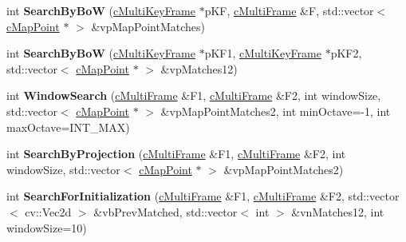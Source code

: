 \begin{DoxyCompactItemize}
\item 
int {\bfseries Search\+By\+BoW} (\hyperlink{classMultiColSLAM_1_1cMultiKeyFrame}{c\+Multi\+Key\+Frame} $\ast$p\+KF, \hyperlink{classMultiColSLAM_1_1cMultiFrame}{c\+Multi\+Frame} \&F, std\+::vector$<$ \hyperlink{classMultiColSLAM_1_1cMapPoint}{c\+Map\+Point} $\ast$ $>$ \&vp\+Map\+Point\+Matches)\hypertarget{classMultiColSLAM_1_1cORBmatcher_ae06c9402eb6badda92ddd6ff73a8bf52}{}\label{classMultiColSLAM_1_1cORBmatcher_ae06c9402eb6badda92ddd6ff73a8bf52}

\item 
int {\bfseries Search\+By\+BoW} (\hyperlink{classMultiColSLAM_1_1cMultiKeyFrame}{c\+Multi\+Key\+Frame} $\ast$p\+K\+F1, \hyperlink{classMultiColSLAM_1_1cMultiKeyFrame}{c\+Multi\+Key\+Frame} $\ast$p\+K\+F2, std\+::vector$<$ \hyperlink{classMultiColSLAM_1_1cMapPoint}{c\+Map\+Point} $\ast$ $>$ \&vp\+Matches12)\hypertarget{classMultiColSLAM_1_1cORBmatcher_aefe9ccdcfd922cf4513e622fa43ee8f8}{}\label{classMultiColSLAM_1_1cORBmatcher_aefe9ccdcfd922cf4513e622fa43ee8f8}

\item 
int {\bfseries Window\+Search} (\hyperlink{classMultiColSLAM_1_1cMultiFrame}{c\+Multi\+Frame} \&F1, \hyperlink{classMultiColSLAM_1_1cMultiFrame}{c\+Multi\+Frame} \&F2, int window\+Size, std\+::vector$<$ \hyperlink{classMultiColSLAM_1_1cMapPoint}{c\+Map\+Point} $\ast$ $>$ \&vp\+Map\+Point\+Matches2, int min\+Octave=-\/1, int max\+Octave=I\+N\+T\+\_\+\+M\+AX)\hypertarget{classMultiColSLAM_1_1cORBmatcher_afad608b615503d3b8790e26ac4017315}{}\label{classMultiColSLAM_1_1cORBmatcher_afad608b615503d3b8790e26ac4017315}

\item 
int {\bfseries Search\+By\+Projection} (\hyperlink{classMultiColSLAM_1_1cMultiFrame}{c\+Multi\+Frame} \&F1, \hyperlink{classMultiColSLAM_1_1cMultiFrame}{c\+Multi\+Frame} \&F2, int window\+Size, std\+::vector$<$ \hyperlink{classMultiColSLAM_1_1cMapPoint}{c\+Map\+Point} $\ast$ $>$ \&vp\+Map\+Point\+Matches2)\hypertarget{classMultiColSLAM_1_1cORBmatcher_ab864baafbebfb40a5c43336d5cd838a4}{}\label{classMultiColSLAM_1_1cORBmatcher_ab864baafbebfb40a5c43336d5cd838a4}

\item 
int {\bfseries Search\+For\+Initialization} (\hyperlink{classMultiColSLAM_1_1cMultiFrame}{c\+Multi\+Frame} \&F1, \hyperlink{classMultiColSLAM_1_1cMultiFrame}{c\+Multi\+Frame} \&F2, std\+::vector$<$ cv\+::\+Vec2d $>$ \&vb\+Prev\+Matched, std\+::vector$<$ int $>$ \&vn\+Matches12, int window\+Size=10)\hypertarget{classMultiColSLAM_1_1cORBmatcher_a2d38eecdcde82ef64a0b51e68e673c80}{}\label{classMultiColSLAM_1_1cORBmatcher_a2d38eecdcde82ef64a0b51e68e673c80}


\end{DoxyCompactItemize}
